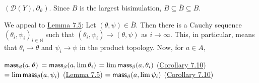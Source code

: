 \documentclass[11pt,a4paper]{amsart}
\begin{document}
\hypertarget{html:S7.SS0.SSS0.P0.SPx7.p1.m4}{}\({({\mathcal{D}}(Y),\partial_{\vartheta})}\). Since %
\hypertarget{html:S7.SS0.SSS0.P0.SPx7.p1.m5}{}\({B}\) is the largest bisimulation, %
\hypertarget{html:S7.SS0.SSS0.P0.SPx7.p1.m6}{}\({B\subseteq\overline{B}\subseteq B}\).
\par\medskip
\hypertarget{html:S7.SS0.SSS0.P0.SPx7.p2}{} We appeal to \hyperlink{html:S7.Thmtheorem5}{Lemma 7.5}: Let %
\hypertarget{html:S7.SS0.SSS0.P0.SPx7.p2.m1}{}\({(\theta,\psi)\in\overline{B}}\). Then there is a Cauchy sequence %
\hypertarget{html:S7.SS0.SSS0.P0.SPx7.p2.m2}{}\({(\theta_{i},\psi_{i})_{i\in\mathbb{N}}}\) such that %
\hypertarget{html:S7.SS0.SSS0.P0.SPx7.p2.m3}{}\({(\theta_{i},\psi_{i})\to(\theta,\psi)}\) as %
\hypertarget{html:S7.SS0.SSS0.P0.SPx7.p2.m4}{}\({i\to\infty}\). This, in particular, means that %
\hypertarget{html:S7.SS0.SSS0.P0.SPx7.p2.m5}{}\({\theta_{i}\to\theta}\) and %
\hypertarget{html:S7.SS0.SSS0.P0.SPx7.p2.m6}{}\({\psi_{i}\to\psi}\) in the product topology. Now, for %
\hypertarget{html:S7.SS0.SSS0.P0.SPx7.p2.m7}{}\({a\in A}\),
\par\medskip
\hypertarget{html:S8.EGx10}{} %
\hypertarget{html:S7.Ex7}{}  %
\hypertarget{html:S7.Ex7.m1}{}\({\displaystyle\mbox{\sf mass}_{\beta}(a,\theta)}\) %
\hypertarget{html:S7.Ex7.m2}{}\({\displaystyle=\mbox{\sf mass}_{\beta}(a,\lim\theta_{i})}\)   %
\hypertarget{html:S7.Ex8}{}   %
\hypertarget{html:S7.Ex8.m1}{}\({\displaystyle=\lim\mbox{\sf mass}_{\beta}(a,\theta_{i})}\)  (\hyperlink{html:S7.Thmtheorem10}{Corollary 7.10})  %
\hypertarget{html:S7.Ex9}{}   %
\hypertarget{html:S7.Ex9.m1}{}\({\displaystyle=\lim\mbox{\sf mass}_{\vartheta}(a,\psi_{i})}\)  (\hyperlink{html:S7.Thmtheorem5}{Lemma 7.5})  %
\hypertarget{html:S7.Ex10}{}   %
\hypertarget{html:S7.Ex10.m1}{}\({\displaystyle=\mbox{\sf mass}_{\vartheta}(a,\lim\psi_{i})}\)  (\hyperlink{html:S7.Thmtheorem10}{Corollary 7.10})  %
\end{document}
